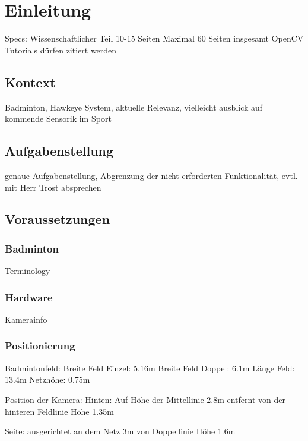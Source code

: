 \chapter{Einleitung}
Specs: 
Wissenschaftlicher Teil 10-15 Seiten
Maximal 60 Seiten insgesamt
OpenCV Tutorials dürfen zitiert werden
\section{Kontext}
Badminton, Hawkeye System, aktuelle Relevanz, vielleicht ausblick auf kommende Sensorik im Sport
\section{Aufgabenstellung}
genaue Aufgabenstellung, Abgrenzung der nicht erforderten Funktionalität, evtl. mit Herr Trost absprechen
\section{Voraussetzungen}
\subsection{Badminton}
Terminology
\subsection{Hardware}
Kamerainfo
\subsection{Positionierung}
Badmintonfeld: 
Breite Feld Einzel: 5.16m
Breite Feld Doppel: 6.1m
Länge Feld: 13.4m
Netzhöhe: 0.75m

Position der Kamera:
Hinten:
Auf Höhe der Mittellinie
2.8m entfernt von der hinteren Feldlinie
Höhe 1.35m

Seite:
ausgerichtet an dem Netz
3m von Doppellinie
Höhe 1.6m